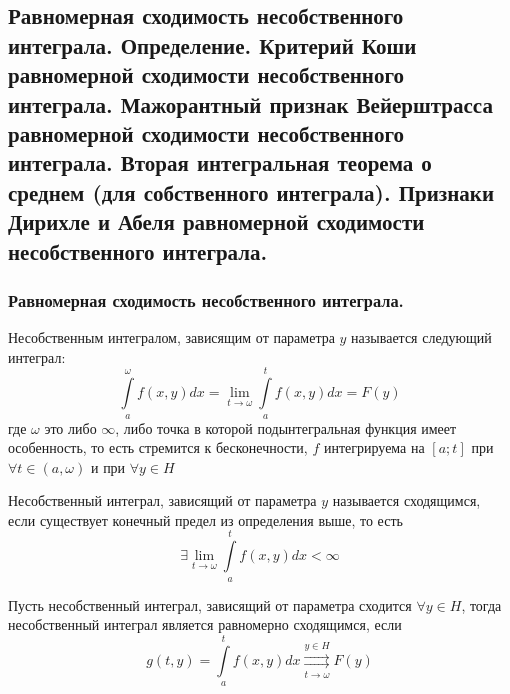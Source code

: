 \subsection{Равномерная сходимость несобственного интеграла. Определение. Критерий Коши равномерной сходимости несобственного интеграла. Мажорантный признак Вейерштрасса равномерной сходимости несобственного интеграла. Вторая интегральная теорема о среднем (для собственного интеграла). Признаки Дирихле и Абеля равномерной сходимости несобственного интеграла.}

\subsubsection{Равномерная сходимость несобственного интеграла.}
\begin{definition*}
Несобственным интегралом, зависящим от параметра $y$ называется следующий интеграл:
\begin{equation*}
        \int\limits_a^\omega f(x,y)dx = \lim\limits_{t\to\omega} \int\limits_a^t f(x,y)dx=F(y)
\end{equation*}
где $\omega$ это либо $\infty$, либо точка в которой подынтегральная функция имеет особенность, то есть стремится к бесконечности, $f$ интегрируема на $[a;t]$ при $\forall t\in(a,\omega)$ и при $\forall y\in H$ 
\end{definition*}
\begin{definition*}
Несобственный интеграл, зависящий от параметра $y$ называется сходящимся, если существует конечный предел из определения выше, то есть
\begin{equation*}
         \exists\lim\limits_{t\to\omega} \int\limits_a^t f(x,y)dx<\infty
\end{equation*}
\end{definition*}
\begin{definition*}
    Пусть несобственный интеграл, зависящий от параметра сходится $\forall y\in H$, тогда несобственный интеграл является равномерно сходящимся, если
    \begin{equation*}
        g(t,y)=\int\limits_a^t f(x,y)dx  \overset{y\in H}{\underset{t\to\omega}{\rightrightarrows}} F(y)
    \end{equation*}
\end{definition*}

